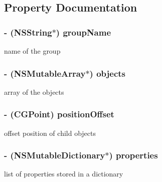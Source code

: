 \subsection{Property Documentation}
\hypertarget{interface_c_c_t_m_x_object_group_a5d0f01f95c03ceeb4691a103974b6144}{
\subsubsection[{group\-Name}]{\setlength{\rightskip}{0pt plus 5cm}-\/ (N\-S\-String$\ast$) {\bf group\-Name}}}\label{interface_c_c_t_m_x_object_group_a5d0f01f95c03ceeb4691a103974b6144}
name of the group \hypertarget{interface_c_c_t_m_x_object_group_aac3da52ce56ed92d32b44500f5bd8f61}{
\subsubsection[{objects}]{\setlength{\rightskip}{0pt plus 5cm}-\/ (N\-S\-Mutable\-Array$\ast$) {\bf objects}}}\label{interface_c_c_t_m_x_object_group_aac3da52ce56ed92d32b44500f5bd8f61}
array of the objects \hypertarget{interface_c_c_t_m_x_object_group_ae945ec4408f80933f0a0ab956fb28a6b}{
\subsubsection[{position\-Offset}]{\setlength{\rightskip}{0pt plus 5cm}-\/ (C\-G\-Point) {\bf position\-Offset}}}\label{interface_c_c_t_m_x_object_group_ae945ec4408f80933f0a0ab956fb28a6b}
offset position of child objects \hypertarget{interface_c_c_t_m_x_object_group_a04a65b75f65112e6bcbd298d875a8ad1}{
\subsubsection[{properties}]{\setlength{\rightskip}{0pt plus 5cm}-\/ (N\-S\-Mutable\-Dictionary$\ast$) {\bf properties}}}\label{interface_c_c_t_m_x_object_group_a04a65b75f65112e6bcbd298d875a8ad1}
list of properties stored in a dictionary 

